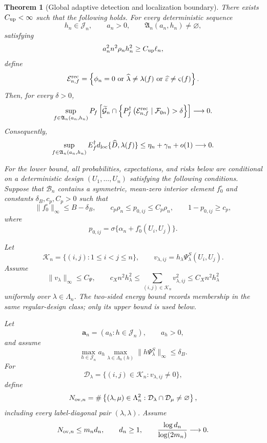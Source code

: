 \documentclass[11pt]{article}
\newtheorem{theorem}{Theorem}[section]
\theoremstyle{definition}
\newcommand{\1}{\mathbf 1}\newcommand{\op}{\operatorname}
\begin{document}
\begin{theorem}[Global adaptive detection and localization boundary]
There exists \(C_{\rm up}<\infty\) such that the following holds.
For every deterministic sequence
\[
h_n\in\mathcal J_n,
\qquad
a_n>0,
\qquad
\mathfrak A_n(a_n,h_n)\ne\varnothing,
\]
satisfying
\begin{equation}
a_n^2n^2\rho_nh_n^2
\ge
C_{\rm up}\ell_n,
\label{eq:t3-17}
\end{equation}
define
\[
\mathcal E_{n,f}^{\rm rec}
=
\left\{
\phi_n=0
\ \text{or}\
\widehat\lambda\ne\lambda(f)
\ \text{or}\
\widehat\varepsilon\ne\varsigma(f)
\right\}.
\]
Then, for every \(\delta>0\),
\begin{equation}
\sup_{f\in\mathfrak A_n(a_n,h_n)}
P_f\left[
\widetilde{\mathcal G}_n
\cap
\left\{
P_f^\dagger
\left(
\mathcal E_{n,f}^{\rm rec}
\mid\mathcal F_{0n}
\right)
>\delta
\right\}
\right]
\longrightarrow0.
\label{eq:t3-18}
\end{equation}
Consequently,
\begin{equation}
\sup_{f\in\mathfrak A_n(a_n,h_n)}
E_f^\dagger
d_{\rm loc}\{\widehat D,\lambda(f)\}
\le
\eta_n+\gamma_n+o(1)
\longrightarrow0.
\label{eq:t3-19}
\end{equation}

For the lower bound, all probabilities, expectations, and risks below
are conditional on a deterministic design
\((U_1,\ldots,U_n)\) satisfying the following conditions.  Suppose
that \(\mathcal B_n\) contains a symmetric, mean-zero interior
element \(f_0^\circ\) and constants \(\delta_B,c_p,C_p>0\) such that
\begin{equation}
\|f_0^\circ\|_\infty\le B-\delta_B,
\qquad
c_p\rho_n\le p_{0,ij}\le C_p\rho_n,
\qquad
1-p_{0,ij}\ge c_p,
\label{eq:t3-20}
\end{equation}
where
\[
p_{0,ij}
=
\sigma\{\alpha_n+f_0^\circ(U_i,U_j)\}.
\]

Let
\[
\mathcal K_n
=
\{(i,j):1\le i<j\le n\},
\qquad
v_{\lambda,ij}
=
h_\lambda\Psi_\lambda^S(U_i,U_j).
\]
Assume
\begin{equation}
\|v_\lambda\|_\infty\le C_\Psi,
\qquad
c_Xn^2h_\lambda^2
\le
\sum_{(i,j)\in\mathcal K_n}v_{\lambda,ij}^2
\le
C_Xn^2h_\lambda^2
\label{eq:t3-21}
\end{equation}
uniformly over \(\lambda\in\Lambda_n\).  The two-sided energy
bound records membership in the same regular-design class; only its
upper bound is used below.

Let
\[
\mathbf a_n=(a_h:h\in\mathcal J_n),
\qquad
a_h>0,
\]
and assume
\begin{equation}
\max_{h\in\mathcal J_n}
a_h
\max_{\lambda\in\Lambda_n(h)}
\|h\Psi_\lambda^S\|_\infty
\le\delta_B.
\label{eq:t3-22}
\end{equation}
For
\[
\mathcal D_\lambda
=
\{(i,j)\in\mathcal K_n:v_{\lambda,ij}\ne0\},
\]
define
\[
N_{{\rm ov},n}
=
\#\left\{
(\lambda,\mu)\in\Lambda_n^2:
\mathcal D_\lambda\cap\mathcal D_\mu\ne\varnothing
\right\},
\]
including every label-diagonal pair \((\lambda,\lambda)\).  Assume
\begin{equation}
N_{{\rm ov},n}
\le m_nd_n,
\qquad
d_n\ge1,
\qquad
\frac{\log d_n}{\log(2m_n)}
\longrightarrow0.
\label{eq:t3-23}
\end{equation}


\end{theorem}
\end{document}
